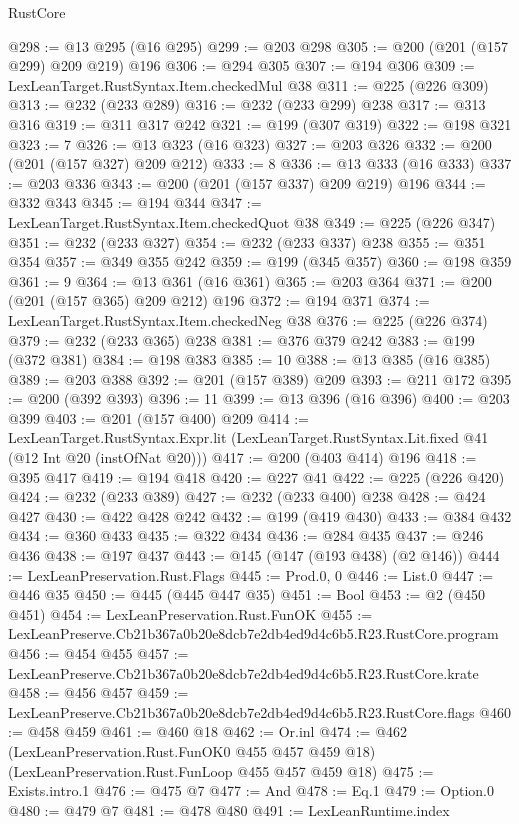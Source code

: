 \begin{lexlean}{RustCore}
\begin{coremodule}
@298 := @13 @295 (@16 @295)
@299 := @203 @298
@305 := @200 (@201 (@157 @299) @209 @219) @196
@306 := @294 @305
@307 := @194 @306
@309 := LexLeanTarget.RustSyntax.Item.checkedMul @38
@311 := @225 (@226 @309)
@313 := @232 (@233 @289)
@316 := @232 (@233 @299) @238
@317 := @313 @316
@319 := @311 @317 @242
@321 := @199 (@307 @319)
@322 := @198 @321
@323 := 7
@326 := @13 @323 (@16 @323)
@327 := @203 @326
@332 := @200 (@201 (@157 @327) @209 @212)
@333 := 8
@336 := @13 @333 (@16 @333)
@337 := @203 @336
@343 := @200 (@201 (@157 @337) @209 @219) @196
@344 := @332 @343
@345 := @194 @344
@347 := LexLeanTarget.RustSyntax.Item.checkedQuot @38
@349 := @225 (@226 @347)
@351 := @232 (@233 @327)
@354 := @232 (@233 @337) @238
@355 := @351 @354
@357 := @349 @355 @242
@359 := @199 (@345 @357)
@360 := @198 @359
@361 := 9
@364 := @13 @361 (@16 @361)
@365 := @203 @364
@371 := @200 (@201 (@157 @365) @209 @212) @196
@372 := @194 @371
@374 := LexLeanTarget.RustSyntax.Item.checkedNeg @38
@376 := @225 (@226 @374)
@379 := @232 (@233 @365) @238
@381 := @376 @379 @242
@383 := @199 (@372 @381)
@384 := @198 @383
@385 := 10
@388 := @13 @385 (@16 @385)
@389 := @203 @388
@392 := @201 (@157 @389) @209
@393 := @211 @172
@395 := @200 (@392 @393)
@396 := 11
@399 := @13 @396 (@16 @396)
@400 := @203 @399
@403 := @201 (@157 @400) @209
@414 := LexLeanTarget.RustSyntax.Expr.lit
    (LexLeanTarget.RustSyntax.Lit.fixed @41 (@12 Int @20 (instOfNat @20)))
@417 := @200 (@403 @414) @196
@418 := @395 @417
@419 := @194 @418
@420 := @227 @41
@422 := @225 (@226 @420)
@424 := @232 (@233 @389)
@427 := @232 (@233 @400) @238
@428 := @424 @427
@430 := @422 @428 @242
@432 := @199 (@419 @430)
@433 := @384 @432
@434 := @360 @433
@435 := @322 @434
@436 := @284 @435
@437 := @246 @436
@438 := @197 @437
@443 := @145 (@147 (@193 @438) (@2 @146))
@444 := LexLeanPreservation.Rust.Flags
@445 := Prod.{0, 0}
@446 := List.{0}
@447 := @446 @35
@450 := @445 (@445 @447 @35)
@451 := Bool
@453 := @2 (@450 @451)
@454 := LexLeanPreservation.Rust.FunOK
@455 := LexLeanPreserve.Cb21b367a0b20e8dcb7e2db4ed9d4c6b5.R23.RustCore.program
@456 := @454 @455
@457 := LexLeanPreserve.Cb21b367a0b20e8dcb7e2db4ed9d4c6b5.R23.RustCore.krate
@458 := @456 @457
@459 := LexLeanPreserve.Cb21b367a0b20e8dcb7e2db4ed9d4c6b5.R23.RustCore.flags
@460 := @458 @459
@461 := @460 @18
@462 := Or.inl
@474 := @462
    (LexLeanPreservation.Rust.FunOK0 @455 @457 @459 @18)
    (LexLeanPreservation.Rust.FunLoop @455 @457 @459 @18)
@475 := Exists.intro.{1}
@476 := @475 @7
@477 := And
@478 := Eq.{1}
@479 := Option.{0}
@480 := @479 @7
@481 := @478 @480
@491 := LexLeanRuntime.index

\end{coremodule}
\end{lexlean}
